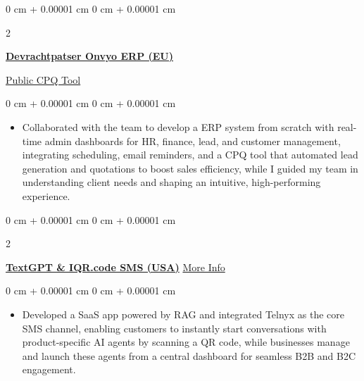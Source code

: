 \documentclass[10pt, letterpaper]{article}
\newenvironment{highlights}{
    \begin{itemize}[
        topsep=0.10 cm,
        parsep=0.10 cm,
        partopsep=0pt,
        itemsep=0pt,
        leftmargin=0 cm + 10pt
    ]
}{
    \end{itemize}
} %
\newenvironment{onecolentry}{
    \begin{adjustwidth}{
        0 cm + 0.00001 cm
    }{
        0 cm + 0.00001 cm
    }
}{
    \end{adjustwidth}
} %
\newenvironment{twocolentry}[2][]{
    \onecolentry
    \def\secondColumn{#2}
    \setcolumnwidth{\fill, 4.5 cm}
    \begin{paracol}{2}
}{
    \switchcolumn \raggedleft \secondColumn
    \end{paracol}
    \endonecolentry
} %
\begin{document}
        \begin{twocolentry}{
            \href{https://leads-patser.vercel.app/}{Public CPQ Tool}
        }
            \href{https://leads-patser.vercel.app/}{\textbf{Devrachtpatser Onvyo ERP (EU)}}
        \end{twocolentry}
        

        \vspace{0.10 cm}
        \begin{onecolentry}
            \begin{highlights}
                \item Collaborated with the team to develop a ERP system from scratch with real-time admin dashboards for HR, finance, lead, and customer management, integrating scheduling, email reminders, and a CPQ tool that automated lead generation and quotations to boost sales efficiency, while I guided my team in understanding client needs and shaping an intuitive, high-performing experience.
            \end{highlights}
        \end{onecolentry}


        \vspace{0.2 cm}

        \begin{twocolentry}{
            \href{https://codemypixel.com/textgpt-case-study/}{More Info}
        }
            \href{https://www.textg.pt/iqr}{\textbf{TextGPT \& IQR.code SMS (USA)}}\end{twocolentry}

        \vspace{0.10 cm}
        \begin{onecolentry}
            \begin{highlights}
                \item Developed a SaaS app powered by RAG and integrated Telnyx as the core SMS channel, enabling customers to instantly start conversations with product-specific AI agents by scanning a QR code, while businesses manage and launch these agents from a central dashboard for seamless B2B and B2C engagement.
            \end{highlights}
        \end{onecolentry}
\end{document}
